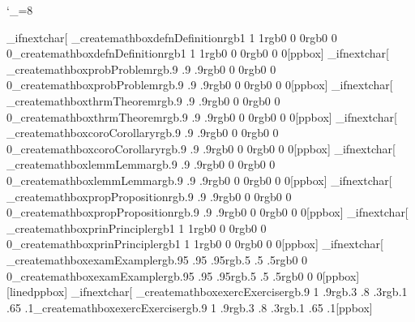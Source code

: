 \def\_createmathbox#1#2#3#4#5[#6]{%
    \_xp\def\csname _b#1\endcsname[##1]{
        \mapkeys{%
            title={%
                name=_title,
                default=\novalue%
            },
            name={%
                name=_name,
                default=\novalue%
            }%
        }{##1}%
        \csname b#6\endcsname{#3}{#4}{#5}%
        {\globalsetters\advancecounter{math counter}{1}\localsetters}%
        \def\curremphcolor{#5}%
        \hbox to\hsize{%
            \emphcolor\printmcount{} #2%
            \unless\ifx\_title\novalue%
                \ (\_title)%
            \fi%
            \unless\ifx\_name\novalue%
                \_xp\anchor\_xp{\_name}%
                \_xp\xdef\csname math@\_name\endcsname{\printmcount}%
                \unless\ifx\_title\novalue%
                    \_xp\xdef\csname math@\_name\endcsname{\_title}%
                    \addthreedepth{\_title}{\_name}%
                \fi%
            \fi%
        \hfil}%
        \hrule height\z@\relax%
        \medskip%
    }%
    \_xp\edef\csname b#1\endcsname{\medskip\noexpand\_ifnextchar[ {\_xp\noexpand\csname _b#1\endcsname}{\_xp\noexpand\csname _b#1\endcsname[]}}%
    \_xp\def\csname e#1\endcsname{\csname e#6\endcsname\medskip}%
}

\def\createmathbox#1#2#3#4#5{\_ifnextchar[ {\_createmathbox{#1}{#2}{#3}{#4}{#5}}{\_createmathbox{#1}{#2}{#3}{#4}{#5}[ppbox]}}

\iftesttime

\def\@bproof[#1]{%
    \blinedppbox{rgb{1 1 1}}{rgb{0 0 0}}{rgb{0 0 0}}
    \hbox to \hsize{\setfont{bf}Proof (#1)\hfil}
    \medskip
}
\def\@@bproof{%
    \blinedppbox{rgb{1 1 1}}{rgb{0 0 0}}{rgb{0 0 0}}
    \hbox to \hsize{\setfont{bf}Proof\hfil}
    \medskip
}
\def\bproof{\@ifnextchar[ \@bproof\@@bproof}
\let\eproof=\elinedppbox

\def\blankpp{%
    \blinedppbox{rgb{1 1 1}}{rgb{0 0 0}}{rgb{0 0 0}}
}
\let\eblankpp=\elinedppbox

\def\bnote{%
    \blinedppbox{rgb{1 1 1}}{rgb{.3 .3 .3}}{rgb{0 0 0}}
    \def\curremphcolor{rgb{.5 .5 .5}}%
    \noindent{\setfont{bf}Note:} %
}
\let\enote=\elinedppbox

\def\__refmath#1{\gotoanchor{#1}{\csname math@#1\endcsname}}
\def\_refmath[#1]#2{\gotoanchor{#2}{#1 \csname math@#2\endcsname}}
\def\refmath{\_ifnextchar[ {\_refmath}{\__refmath}}
\catcode`_=8

\createmathbox{defn}{Definition}{rgb{1 1 1}}{rgb{0 0 0}}{rgb{0 0 0}}
\createmathbox{prob}{Problem}{rgb{.9 .9 .9}}{rgb{0 0 0}}{rgb{0 0 0}}
\createmathbox{thrm}{Theorem}{rgb{.9 .9 .9}}{rgb{0 0 0}}{rgb{0 0 0}}
\createmathbox{coro}{Corollary}{rgb{.9 .9 .9}}{rgb{0 0 0}}{rgb{0 0 0}}
\createmathbox{lemm}{Lemma}{rgb{.9 .9 .9}}{rgb{0 0 0}}{rgb{0 0 0}}
\createmathbox{prop}{Proposition}{rgb{.9 .9 .9}}{rgb{0 0 0}}{rgb{0 0 0}}
\createmathbox{prin}{Principle}{rgb{1 1 1}}{rgb{0 0 0}}{rgb{0 0 0}}
\createmathbox{exam}{Example}{rgb{.95 .95 .95}}{rgb{.5 .5 .5}}{rgb{0 0 0}}[linedppbox]
\createmathbox{exerc}{Exercise}{rgb{.9 1 .9}}{rgb{.3 .8 .3}}{rgb{.1 .65 .1}}

